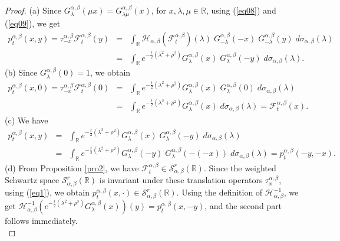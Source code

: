 \documentclass[a4paper,11pt, reqno]{amsart}
\theoremstyle{plain}
\theoremstyle{definition}
\theoremstyle{remark}
\def \R{{\mathbb R}}
\def\R{\mathbb R}
\def \S{{\mathcal S}}
\def \H{{\mathcal H}}
\begin{document}
\begin{proof}
(a) Since $G^{\alpha, \beta}_{\lambda}(\mu x)=G^{\alpha, \beta}_{\lambda \mu}(x)$, for $x, \lambda, \mu \in \R$, using (\ref{eq08}) and (\ref{eq09}), we get
\begin{eqnarray*}
p_t^{\alpha, \beta}(x, y) =  \tau^{\alpha, \beta}_{-x} \mathcal{F}_t^{\alpha, \beta}(y)
& = & \int_{\mathbb{R}} \H_{\alpha, \beta} \left(\mathcal{F}_t^{\alpha, \beta} \right) (\lambda) \; G^{\alpha, \beta}_{-\lambda}(-x) \; G^{\alpha, \beta}_{-\lambda}(y) \;  d\sigma_{\alpha, \beta}(\lambda) \\
& = & \int_{\mathbb{R}} e^{-\frac{t}{2}\left( \lambda^2+\rho^2\right)}  G^{\alpha, \beta}_{\lambda}(x) \; G^{\alpha, \beta}_{\lambda}(-y) \;  d\sigma_{\alpha, \beta}(\lambda).
\end{eqnarray*}
(b) Since $G^{\alpha, \beta}_\lambda(0)=1$, we obtain
\begin{eqnarray*}
p_t^{\alpha, \beta}(x, 0) =  \tau^{\alpha, \beta}_{-x} \mathcal{F}_t^{\alpha, \beta}(0)
& = & \int_{\mathbb{R}} e^{-\frac{t}{2}\left( \lambda^2+\rho^2\right)}  G^{\alpha, \beta}_{\lambda}(x) \; G^{\alpha, \beta}_{\lambda}(0) \;  d\sigma_{\alpha, \beta}(\lambda) \\
& = & \int_{\mathbb{R}} e^{-\frac{t}{2}\left( \lambda^2+\rho^2\right)}  G^{\alpha, \beta}_{\lambda}(x) \;  d\sigma_{\alpha, \beta}(\lambda) 
= \mathcal{F}_t^{\alpha, \beta}(x).
\end{eqnarray*}
(c) We have
\begin{eqnarray*}
p_t^{\alpha, \beta}(x, y) 
& = & \int_{\mathbb{R}} e^{-\frac{t}{2}\left( \lambda^2+\rho^2\right)}  G^{\alpha, \beta}_{\lambda}(x) \; G^{\alpha, \beta}_{\lambda}(-y) \;  d\sigma_{\alpha, \beta}(\lambda) \\
& = & \int_{\mathbb{R}} e^{-\frac{t}{2}\left( \lambda^2+\rho^2\right)}  G^{\alpha, \beta}_{\lambda}(-y) \;G^{\alpha, \beta}_{\lambda}(-(-x)) \;    d\sigma_{\alpha, \beta}(\lambda)
= p_t^{\alpha, \beta}(-y, -x).
\end{eqnarray*}
(d) From Proposition \ref{pro2}, we have $\mathcal{F}_t^{\alpha, \beta} \in \S^r_{\alpha, \beta} (\mathbb{R})$. Since the weighted Schwartz space $\S^r_{\alpha, \beta} (\mathbb{R})$ is invariant under these translation operators $\tau^{\alpha, \beta}_{x}$, using (\ref{eq1}), we obtain $p_t^{\alpha, \beta}(x, \cdot) \in \S^r_{\alpha, \beta} (\mathbb{R})$. Using the definition of $\H^{-1}_{\alpha, \beta}$, we get $\H^{-1}_{\alpha, \beta} \left( e^{-\frac{t}{2}\left( \lambda^2+\rho^2\right)} G^{\alpha, \beta}_\lambda(x) \right) (y)= p_t^{\alpha, \beta}(x, -y)$, and the second part follows immediately.\\

\end{proof}
\end{document}
